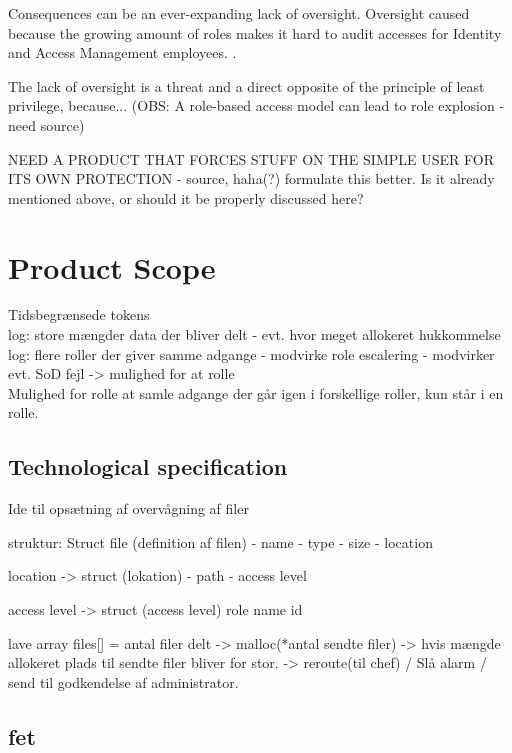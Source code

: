 \documentclass[12pt,a4paper]{article}
\begin{document}
Consequences can be an ever-expanding lack of oversight. Oversight caused because the growing amount of roles makes it hard to audit accesses for Identity and Access Management employees. \cite{role_explosion}.

The lack of oversight is a threat and a direct opposite of the principle of least privilege, because... 
(OBS: A role-based access model can lead to role explosion - need source)

NEED A PRODUCT THAT FORCES STUFF ON THE SIMPLE USER FOR ITS OWN PROTECTION - source, haha(?) formulate this better. Is it already mentioned above, or should it be properly discussed here?

\section{Product Scope}

Tidsbegrænsede tokens
\\
log: store mængder data der bliver delt - evt. hvor meget allokeret hukkommelse
\\
log: flere roller der giver samme adgange - modvirke role escalering - modvirker evt. SoD fejl -> mulighed for at rolle
\\
Mulighed for rolle at samle adgange der går igen i forskellige roller, kun står i en rolle. 
\\


\subsection{Technological specification}
Ide til opsætning af overvågning af filer

struktur:
Struct file (definition af filen)
- name
- type
- size
- location

location -> 
struct (lokation)
- path
- access level

access level ->
struct (access level)
role
name 
id

lave array
files[] = antal filer delt
-> malloc(*antal sendte filer)
-> hvis mængde allokeret plads til sendte filer bliver for stor. 
-> reroute(til chef) / Slå alarm / send til godkendelse af administrator.


\subsection{fet}
\label{Technical Specifications}


\clearpage
\end{document}
